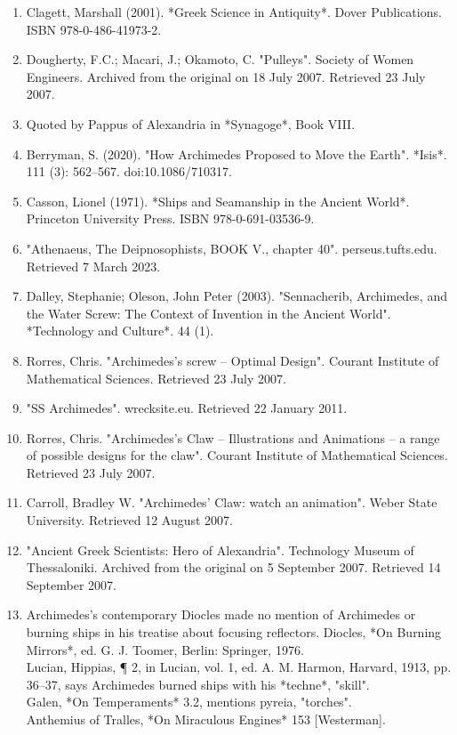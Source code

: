 \begin{enumerate}
\item Clagett, Marshall (2001). *Greek Science in Antiquity*. Dover Publications. ISBN 978-0-486-41973-2.
\item Dougherty, F.C.; Macari, J.; Okamoto, C. "Pulleys". Society of Women Engineers. Archived from the original on 18 July 2007. Retrieved 23 July 2007.
\item Quoted by Pappus of Alexandria in *Synagoge*, Book VIII.
\item Berryman, S. (2020). "How Archimedes Proposed to Move the Earth". *Isis*. 111 (3): 562–567. doi:10.1086/710317.
\item Casson, Lionel (1971). *Ships and Seamanship in the Ancient World*. Princeton University Press. ISBN 978-0-691-03536-9.
\item "Athenaeus, The Deipnosophists, BOOK V., chapter 40". perseus.tufts.edu. Retrieved 7 March 2023.
\item Dalley, Stephanie; Oleson, John Peter (2003). "Sennacherib, Archimedes, and the Water Screw: The Context of Invention in the Ancient World". *Technology and Culture*. 44 (1).
\item Rorres, Chris. "Archimedes's screw – Optimal Design". Courant Institute of Mathematical Sciences. Retrieved 23 July 2007.
\item "SS Archimedes". wrecksite.eu. Retrieved 22 January 2011.
\item Rorres, Chris. "Archimedes's Claw – Illustrations and Animations – a range of possible designs for the claw". Courant Institute of Mathematical Sciences. Retrieved 23 July 2007.
\item Carroll, Bradley W. "Archimedes' Claw: watch an animation". Weber State University. Retrieved 12 August 2007.
\item "Ancient Greek Scientists: Hero of Alexandria". Technology Museum of Thessaloniki. Archived from the original on 5 September 2007. Retrieved 14 September 2007.
\item Archimedes's contemporary Diocles made no mention of Archimedes or burning ships in his treatise about focusing reflectors. Diocles, *On Burning Mirrors*, ed. G. J. Toomer, Berlin: Springer, 1976.\\
Lucian, Hippias, ¶ 2, in Lucian, vol. 1, ed. A. M. Harmon, Harvard, 1913, pp. 36–37, says Archimedes burned ships with his *techne*, "skill".\\
Galen, *On Temperaments* 3.2, mentions pyreia, "torches".\\
Anthemius of Tralles, *On Miraculous Engines* 153 [Westerman].\\

\end{enumerate}

